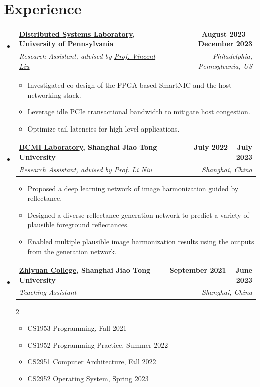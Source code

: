 \documentclass[letterpaper,11pt]{article}
\makeatletter
\newcommand{\resumeItem}[1]{
  \item\small{
    {#1 \vspace{-2pt}}
  }
}
\newcommand{\resumeSubheading}[4]{
  \vspace{-2pt}\item
    \begin{tabular*}{1.0\textwidth}[t]{l@{\extracolsep{\fill}}r}
      \textbf{#1} & \textbf{\small #2} \\
      \textit{\small#3} & \textit{\small #4} \\
    \end{tabular*}\vspace{-7pt}
}
\newcommand{\resumeSubHeadingListStart}{\begin{itemize}[leftmargin=0.0in, label={}]}
\newcommand{\resumeSubHeadingListEnd}{\end{itemize}}
\newcommand{\resumeItemListStart}{\begin{itemize}}
\newcommand{\resumeItemListEnd}{\end{itemize}\vspace{4pt}}
\newcommand{\grayunderline}[1]{\setulcolor{lightgray}\setul{0.5ex}{0.1pt}\ul{#1}}
\makeatother
\begin{document}
\section{Experience}
    \resumeSubHeadingListStart
    \resumeSubheading
        {\href{https://dsl.cis.upenn.edu/}{\grayunderline{Distributed Systems Laboratory}}, University of Pennsylvania}{August 2023 -- December 2023}
        {Research Assistant, advised by \href{https://vincen.tl/}{\grayunderline{Prof. Vincent Liu}}}{Philadelphia, Pennsylvania, US}
        \resumeItemListStart
            \resumeItem{Investigated co-design of the FPGA-based SmartNIC and the host networking stack.}
            \resumeItem{Leverage idle PCIe transactional bandwidth to mitigate host congestion.}
            \resumeItem{Optimize tail latencies for high-level applications.}
        \resumeItemListEnd

    \resumeSubheading
        {\href{https://bcmi.sjtu.edu.cn/}{\grayunderline{BCMI Laboratory}}, Shanghai Jiao Tong University}{July 2022 -- July 2023}
      {Research Assistant, advised by \href{https://www.ustcnewly.com/}{\grayunderline{Prof. Li Niu}}}{Shanghai, China}
        \resumeItemListStart
            \resumeItem{Proposed a deep learning network of image harmonization guided by reflectance.}
            \resumeItem{Designed a diverse reflectance generation network to predict a variety of plausible foreground reflectances.}
            \resumeItem{Enabled multiple plausible image harmonization results using the outputs from the generation network.}
        \resumeItemListEnd

    \resumeSubheading
        {\href{https://en.zhiyuan.sjtu.edu.cn/}{\grayunderline{Zhiyuan College}}, Shanghai Jiao Tong University}{September 2021 -- June 2023}
        {Teaching Assistant}{Shanghai, China}
        \vspace{7pt}
        \begin{multicols}{2}
            \begin{itemize}[itemsep=0pt, parsep=0pt]
                \item\small CS1953 Programming, Fall 2021
                \item CS1952 Programming Practice, Summer 2022
                \item CS2951 Computer Architecture, Fall 2022
                \item CS2952 Operating System, Spring 2023
            \end{itemize}
        \end{multicols}
    \resumeSubHeadingListEnd
  
\end{document}
